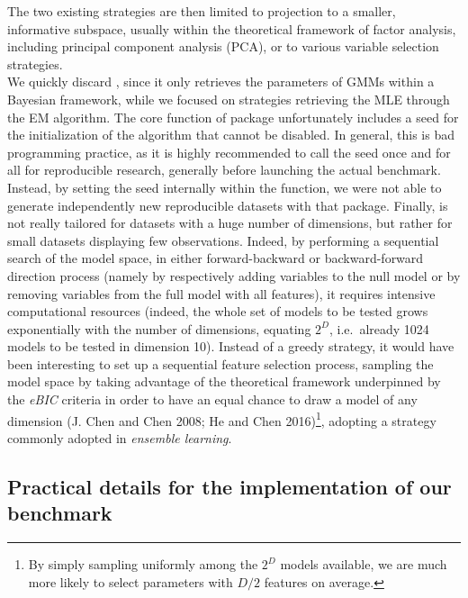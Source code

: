 The two existing strategies are then limited to projection to a smaller, informative subspace, usually within the theoretical framework of factor analysis, including principal component analysis (PCA), or to various variable selection strategies.\\
We quickly discard , since it only retrieves the parameters of GMMs within a Bayesian framework, while we focused on strategies retrieving the MLE through the EM algorithm. The core function  of  package unfortunately includes a seed for the initialization of the algorithm that cannot be disabled. In general, this is bad programming practice, as it is highly recommended to call the seed once and for all for reproducible research, generally before launching the actual benchmark. Instead, by setting the seed internally within the function, we were not able to generate independently new reproducible datasets with that package. Finally,  is not really tailored for datasets with a huge number of dimensions, but rather for small datasets displaying few observations. Indeed, by performing a sequential search of the model space, in either forward-backward or backward-forward direction process (namely by respectively adding variables to the null model or by removing variables from the full model with all features), it requires intensive computational resources (indeed, the whole set of models to be tested grows exponentially with the number of dimensions, equating \(2^D\), i.e.~already 1024 models to be tested in dimension 10). Instead of a greedy strategy, it would have been interesting to set up a sequential feature selection process, sampling the model space by taking advantage of the theoretical framework underpinned by the \emph{eBIC} criteria in order to have an equal chance to draw a model of any dimension (J. Chen and Chen 2008; He and Chen 2016)\footnote{By simply sampling uniformly among the \(2^D\) models available, we are much more likely to select parameters with \(D/2\) features on average.}, adopting a strategy commonly adopted in \emph{ensemble learning}.
\color{black}

\hypertarget{practical-details-for-the-implementation-of-our-benchmark}{%
\subsection{Practical details for the implementation of our benchmark}\label{practical-details-for-the-implementation-of-our-benchmark}}

